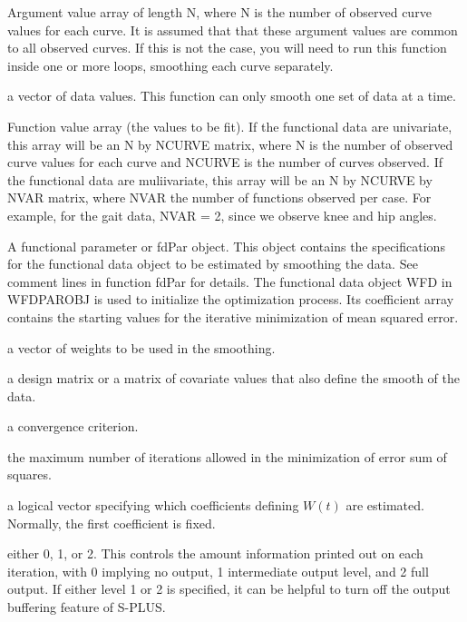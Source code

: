 \begin{Arguments}
\begin{ldescription}
\item[\code{argvals}] Argument value array of length N, where N is the number of observed
curve values for each curve.  It is assumed that that these argument
values are common to all observed curves.  If this is not the case,
you will need to run this function inside one or more loops,
smoothing each curve separately.

\item[\code{y}] a vector of data values.  This function can only smooth one set of
data at a time.

Function value array (the values to be fit).  If the functional data
are univariate, this array will be an N by NCURVE matrix, where N is
the number of observed curve values for each curve and NCURVE is the
number of curves observed.  If the functional data are muliivariate,
this array will be an N by NCURVE by NVAR matrix, where NVAR the
number of functions observed per case.  For example, for the gait
data, NVAR = 2, since we observe knee and hip angles.

\item[\code{WfdParobj}] A functional parameter or fdPar object.  This object contains the
specifications for the functional data object to be estimated by
smoothing the data.  See comment lines in function fdPar for
details.  The functional data object WFD in WFDPAROBJ is used to
initialize the optimization process.  Its coefficient array contains
the starting values for the iterative minimization of mean squared
error.

\item[\code{wtvec}] a vector of weights to be used in the smoothing.

\item[\code{zmat}] a design matrix or a matrix of covariate values that also define the
smooth of the data.

\item[\code{conv}] a convergence criterion.

\item[\code{iterlim}] the maximum number of iterations allowed in the minimization of
error sum of squares.

\item[\code{active}] a logical vector specifying which coefficients defining $W(t)$ are
estimated.  Normally, the first coefficient is fixed.

\item[\code{dbglev}] either 0, 1, or 2.  This controls the amount information printed out
on each iteration, with 0 implying no output, 1 intermediate output
level, and 2 full output.  If either level 1 or 2 is specified, it
can be helpful to turn off the output buffering feature of S-PLUS.

\end{ldescription}
\end{Arguments}
